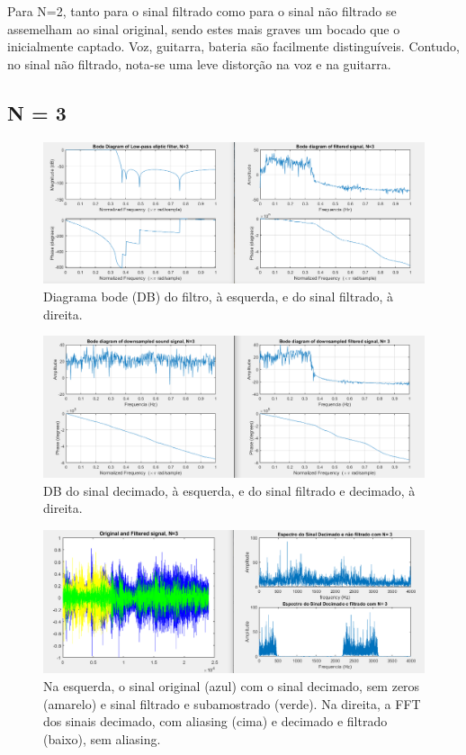 \documentclass{article}
\begin{document}
\raggedright
\vspace{5mm} %

Para N=2, tanto para o sinal filtrado como para o sinal não filtrado se assemelham ao sinal original, sendo estes mais graves um bocado que o inicialmente captado. Voz, guitarra, bateria são facilmente distinguíveis.
Contudo, no  sinal não filtrado, nota-se uma leve distorção na voz e na guitarra.

\newpage


\subsection{N = 3}
\vfill
\begin{figure}[h!]
\centering
\includegraphics[scale=0.5]{matlab_test_images/cut_images/fil5.PNG}
\caption{Diagrama bode (DB) do filtro, à esquerda, e do sinal filtrado, à direita.}
\label{fig:matlab_test_images/cut_images/fil5}
\end{figure}
\begin{figure}[h!]
\centering
\includegraphics[scale=0.5]{matlab_test_images/cut_images/fil6.PNG}
\caption{DB do sinal decimado, à esquerda, e do sinal filtrado e decimado, à direita.}
\label{fig:matlab_test_images/cut_images/fil6}
\end{figure}  
\newpage
\begin{figure}[h!]
\centering
\includegraphics[scale=0.5]{matlab_test_images/cut_images/fil7.PNG}
\caption{Na esquerda, o sinal original (azul) com o sinal decimado, sem zeros (amarelo) e sinal filtrado e subamostrado (verde). Na direita, a FFT dos sinais decimado, com aliasing (cima) e decimado e filtrado (baixo), sem aliasing.}
\label{fig:matlab_test_images/cut_images/fil7}
\end{figure}  
\end{document}
